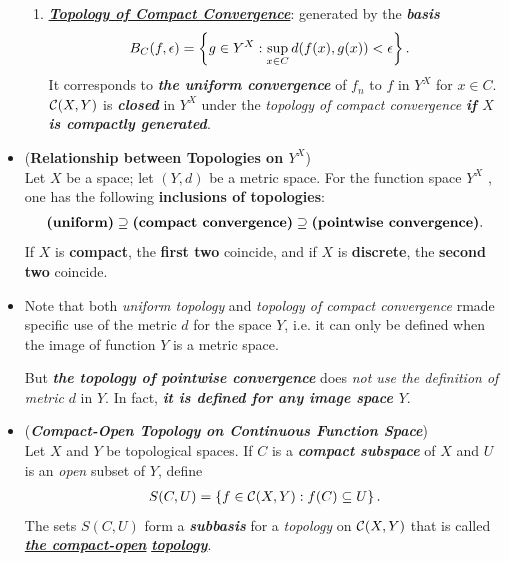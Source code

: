 \documentclass[11pt]{article}
\begin{document}
\begin{itemize}
\begin{remark}
\begin{enumerate}
\item \underline{\emph{\textbf{Topology of Compact Convergence}}}: generated by the \emph{\textbf{basis}}
\begin{align*}
B_{C}(f, \epsilon) &= \left\{g \in Y^X: \sup_{x \in C}d(f (x), g(x)) < \epsilon \right\}.
\end{align*} It corresponds to \emph{\textbf{the uniform convergence}} of $f_n$ to $f$ in $Y^X$ for $x \in C$. ${\mathcal C}(X, Y)$ is \emph{\textbf{closed}} in $Y^X$ under the \emph{topology of compact convergence} \emph{\textbf{if $X$ is compactly generated}}.
\end{enumerate}
\end{remark}

\item \begin{theorem} (\textbf{Relationship between Topologies on $Y^X$}) \citep{munkres2000topology}\\
Let $X$ be a space; let $(Y, d)$ be a metric space. For the function space $Y^X$ , one has the following \textbf{inclusions of topologies}:
\begin{align*}
\text{\textbf{(uniform)}} \supseteq \text{\textbf{(compact convergence)}} \supseteq \text{\textbf{(pointwise convergence)}}.
\end{align*}
If $X$ is \textbf{compact}, the \textbf{first two} coincide, and if $X$ is \textbf{discrete}, the \textbf{second two} coincide.
\end{theorem}

\item \begin{remark}
Note that both \emph{uniform topology} and \emph{topology of compact convergence} rmade specific use of the metric $d$ for the space $Y$, i.e. it can only be defined when the image of function $Y$  is a metric space.

But \emph{\textbf{the topology of  pointwise convergence}} does \emph{not use the definition of metric} $d$ in $Y$. In fact, \emph{\textbf{it is defined for any image space $Y$}}.
\end{remark}

\item \begin{definition} (\emph{\textbf{Compact-Open Topology on Continuous Function Space}})\\
Let $X$ and $Y$ be topological spaces. If $C$ is a \emph{\textbf{compact subspace}} of $X$ and $U$ is an \emph{open} subset of $Y$, define
\begin{align*}
S(C,U) = \left\{ f \in {\mathcal C}(X, Y): f(C) \subseteq U\right\}.
\end{align*}
The sets $S(C, U)$ form a \emph{\textbf{subbasis}} for a \emph{topology} on ${\mathcal C}(X, Y)$ that is called \underline{\emph{\textbf{the compact-open}}} \underline{\emph{\textbf{topology}}}.
\end{definition}


\end{itemize}
\end{document}
